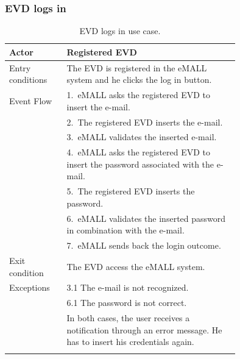 \subsubsection*{EVD logs in}
\begin{center}
    \begin{longtable}{lp{0.75\linewidth}}
        \hline
        Actor            & Registered EVD                                                                       \\
        \hline
        Entry conditions & The EVD is registered in the eMALL system and he clicks the log in button.           \\
        \hline
        Event Flow       & 1.\ eMALL asks the registered EVD to insert the e-mail.                              \\
        & 2.\ The registered EVD inserts the e-mail.                                           \\
        & 3.\ eMALL validates the inserted e-mail.                                             \\
        & 4.\ eMALL asks the registered EVD to insert the password associated with the e-mail. \\
        & 5.\ The registered EVD inserts the password.                                         \\
        & 6.\ eMALL validates the inserted password in combination with the e-mail.            \\
        & 7.\ eMALL sends back the login outcome.                                              \\
        \hline
        Exit condition   & The EVD access the eMALL system.                                                     \\
        \hline
        Exceptions       & 3.1 The e-mail is not recognized.                                                    \\
        & 6.1 The password is not correct.                                                     \\
        & In both cases, the user receives a notification through an error message.
        He has to insert his credentials again. \\
        \hline
        \caption{EVD logs in use case.}
        \label{tab: EVD_logs_in_use_case}
    \end{longtable}
\end{center}

